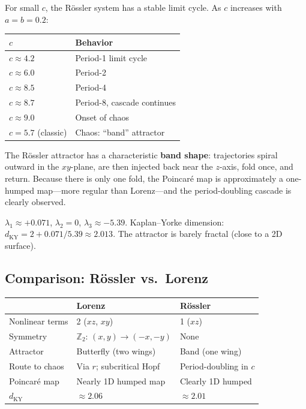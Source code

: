\documentclass[11pt,letterpaper]{article}
\theoremstyle{definition}
\theoremstyle{plain}
\theoremstyle{remark}
\begin{document}
For small $c$, the Rössler system has a stable limit cycle.  As $c$
increases with $a=b=0.2$:
\begin{center}
\renewcommand{\arraystretch}{1.3}
\begin{tabular}{@{}ll@{}}
\toprule
$c$ & Behavior \\
\midrule
$c \approx 4.2$ & Period-1 limit cycle \\
$c \approx 6.0$ & Period-2 \\
$c \approx 8.5$ & Period-4 \\
$c \approx 8.7$ & Period-8, cascade continues \\
$c \approx 9.0$ & Onset of chaos \\
$c = 5.7$ (classic) & Chaos: ``band'' attractor \\
\bottomrule
\end{tabular}
\end{center}

The Rössler attractor has a characteristic \textbf{band shape}:
trajectories spiral outward in the $xy$-plane, are then injected back
near the $z$-axis, fold once, and return.  Because there is only one
fold, the Poincaré map is approximately a one-humped map---more
regular than Lorenz---and the period-doubling cascade is clearly
observed.

\begin{keyresult}
$\lambda_1 \approx +0.071$, $\lambda_2 = 0$, $\lambda_3 \approx -5.39$.
Kaplan--Yorke dimension: $d_{\mathrm{KY}} = 2 + 0.071/5.39 \approx 2.013$.
The attractor is barely fractal (close to a 2D surface).
\end{keyresult}

\subsection{Comparison: Rössler vs.\ Lorenz}

\begin{center}
\renewcommand{\arraystretch}{1.3}
\begin{tabular}{@{}lll@{}}
\toprule
& \textbf{Lorenz} & \textbf{Rössler} \\
\midrule
Nonlinear terms & 2 ($xz$, $xy$) & 1 ($xz$) \\
Symmetry & $\mathbb{Z}_2$: $(x,y)\to(-x,-y)$ & None \\
Attractor & Butterfly (two wings) & Band (one wing) \\
Route to chaos & Via $r$; subcritical Hopf & Period-doubling in $c$ \\
Poincaré map & Nearly 1D humped map & Clearly 1D humped \\
$d_{\mathrm{KY}}$ & $\approx 2.06$ & $\approx 2.01$ \\
\bottomrule
\end{tabular}
\end{center}
\end{document}
